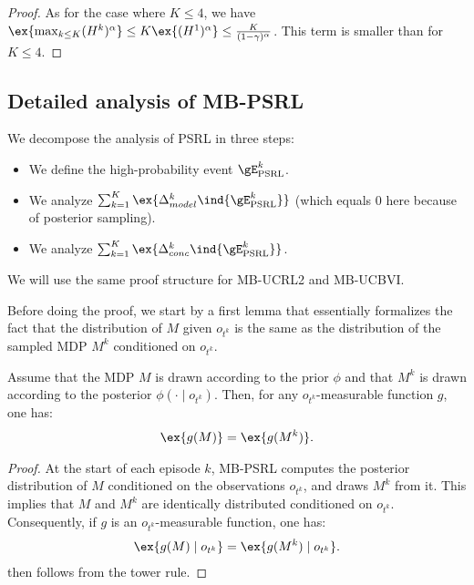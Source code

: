 \begin{subappendices}
\begin{proof}
    As for the case where $K\le4$, we have $\ex{\max_{k\le K}(H^k)^\alpha}\le K\ex{(H^1)^\alpha}\le \frac{K}{(1-\gamma)^{\alpha}}$. This term is smaller than  for $K\le4$.
 \end{proof}


\subsection{Detailed analysis of MB-PSRL}
\label{ssec:proof_PSRL}

We decompose the analysis of PSRL in three steps: 
\begin{itemize}
    \item We define the high-probability event $\gE_\text{PSRL}^{k}$.
    \item We analyze $\sum_{k=1}^K\ex{\Delta_{model}^k \ind{\gE_\text{PSRL}^{k}}}$ (which equals $0$ here because of posterior sampling).
    \item We analyze $\sum_{k=1}^K\ex{\Delta_{conc}^k \ind{\gE_\text{PSRL}^{k}}}$. 
\end{itemize}
We will use the same proof structure for MB-UCRL2 and MB-UCBVI. 

Before doing the proof, we start by a first lemma that essentially formalizes the fact that the distribution of $M$ given $o_{t^k}$ is the same as the distribution of the sampled MDP $M^{k}$ conditioned on $o_{t^k}$. 
\begin{lem}
    \label{lem:bayesian}
    Assume that the MDP $M$ is drawn according to the prior $\phi$ and that $M^k$ is drawn according to the posterior $\phi(\cdot \mid o_{t^k})$. Then, for any $o_{t^k}$-measurable function $g$, one has:
    \begin{align}
        \label{eq:lem_bayesian}
        \ex{g(M)} = \ex{g(M^k)}. 
    \end{align}
\end{lem}
\begin{proof}
    At the start of each episode $k$, MB-PSRL computes the posterior distribution of $M$ conditioned on the observations $o_{t^k}$, and draws $M^k$ from it. This implies that $M$ and $M^k$ are identically distributed conditioned on $o_{t^k}$. Consequently, if $g$ is an $o_{t^k}$-measurable function, one has:
    \begin{align*}
        \ex{g(M) \mid o_{t^k}} = \ex{g(M^k) \mid o_{t^k}}. 
    \end{align*}
     then follows from the tower rule. 
\end{proof}


\end{subappendices}
